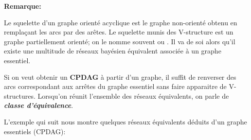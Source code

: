 \documentclass[a4paper]{article}
\begin{document}
\textbf{Remarque:}


Le squelette  d'un graphe orienté acyclique est le graphe non-orienté obtenu en remplaçant les arcs par des arêtes.
Le squelette munis des V-structure est un graphe partiellement orienté;
on le nomme souvent  ou .
Il va de soi alors qu'il existe une multitude de réseaux bayésien  équivalent associée à un graphe essentiel.

Si on veut obtenir un \textbf{CPDAG} à partir d'un graphe, il suffit de renverser des arcs correspondant aux  arrêtes du graphe essentiel  sans faire  apparaitre de V-structures.
Lorsqu'on réunit l'ensemble des réseaux équivalents,
on parle de \textbf{\textit{classe d'équivalence}}.


L'exemple qui suit  nous montre quelques réseaux équivalents déduits d'un graphe essentiels (CPDAG):
\end{document}
